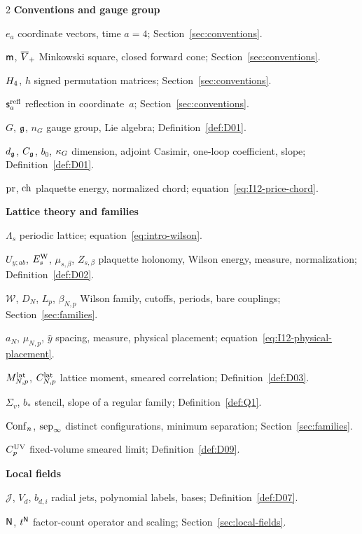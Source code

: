 \begin{multicols}{2}
\footnotesize
\setlength{\parindent}{0pt}
\setlength{\parskip}{1pt}
\raggedcolumns
{}
\textbf{Conventions and gauge group}\par
$e_a$ coordinate vectors, time $a=4$; Section~\ref{sec:conventions}.

$\mathsf{m}$, $\overline{V}_+$ Minkowski square, closed forward cone; Section~\ref{sec:conventions}.

$H_4$, $h$ signed permutation matrices; Section~\ref{sec:conventions}.

$\mathsf s_a^{\rm refl}$ reflection in coordinate~$a$; Section~\ref{sec:conventions}.

$G$, $\mathfrak{g}$, $n_G$ gauge group, Lie algebra; Definition~\ref{def:D01}.

$d_{\mathfrak{g}}$, $C_{\mathfrak{g}}$, $b_0$, $\kappa_G$ dimension, adjoint Casimir, one-loop coefficient, slope; Definition~\ref{def:D01}.

$\operatorname{pr}$, $\operatorname{ch}$ plaquette energy, normalized chord; equation~\eqref{eq:I12-price-chord}.

\medskip\textbf{Lattice theory and families}\par
$\Lambda_s$ periodic lattice; equation~\eqref{eq:intro-wilson}.

$U_{y;ab}$, $E_s^{\rm W}$, $\mu_{s,\beta}$, $Z_{s,\beta}$ plaquette holonomy, Wilson energy, measure, normalization; Definition~\ref{def:D02}.

$\mathcal W$, $D_N$, $L_p$, $\beta_{N,p}$ Wilson family, cutoffs, periods, bare couplings; Section~\ref{sec:families}.

$a_N$, $\mu_{N,p}$, $\hat y$ spacing, measure, physical placement; equation~\eqref{eq:I12-physical-placement}.

$M^{\mathrm{lat}}_{N,p}$, $C^{\mathrm{lat}}_{N,p}$ lattice moment, smeared correlation; Definition~\ref{def:D03}.

$\Sigma_v$, $b_*$ stencil, slope of a regular family; Definition~\ref{def:Q1}.

$\mathrm{Conf}_{n}$, $\operatorname{sep}_{\infty}$ distinct configurations, minimum separation; Section~\ref{sec:families}.

$C_p^{\rm UV}$ fixed-volume smeared limit; Definition~\ref{def:D09}.

\medskip\textbf{Local fields}\par
$\mathcal J$, $V_d$, $b_{d,i}$ radial jets, polynomial labels, bases; Definition~\ref{def:D07}.

$\mathsf{N}$, $t^{\mathsf{N}}$ factor-count operator and scaling; Section~\ref{sec:local-fields}.


\end{multicols}
